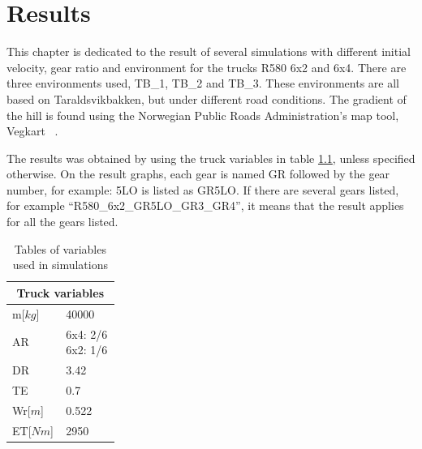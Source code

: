 \documentclass[noprint]{uit-thesis}
\begin{document}
\chapter{Results}
\label{results}
This chapter is dedicated to the result of several simulations with different initial velocity, gear ratio and environment for the trucks R580 6x2 and 6x4. There are three environments used, TB\_1, TB\_2 and TB\_3. These environments are all based on Taraldsvikbakken, but under different road conditions. The gradient of the hill is found using the Norwegian Public Roads Administration’s map tool, Vegkart ~\citep{vegkart}.
\par
The results was obtained by using the truck variables in table \ref{tab:usedVariables}, unless specified otherwise. On the result graphs, each gear is named GR followed by the gear number, for example: 5LO is listed as GR5LO. If there are several gears listed, for example “R580\_6x2\_GR5LO\_GR3\_GR4”, it means that the result applies for all the gears listed. 

\renewcommand{\arraystretch}{1.2}
\begin{table}[H]
\center
\begin{tabular}{|p{0.49\linewidth} | p{0.49\linewidth}|} 

 \hline
\multicolumn{2}{|c|}{\textbf{Truck variables}} \\
 \hline 
m[$kg$] & 40000 \\

AR & \makecell[l]{6x4: 2/6 \\ 6x2: 1/6} \\

DR & 3.42 \\

TE & 0.7 \\

Wr[$m$] & 0.522 \\

ET[$Nm$] & 2950 \\

 \hline
\end{tabular}
\caption{Tables of variables used in simulations}
\label{tab:usedVariables}
\end{table}

\end{document}
